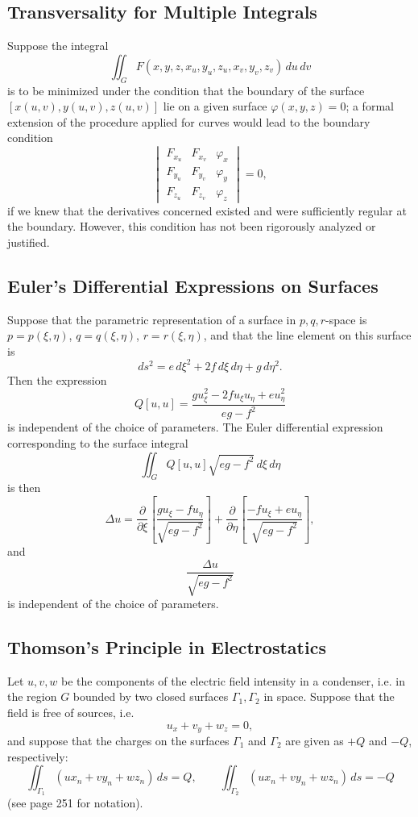 \subsection{Transversality for Multiple Integrals}
Suppose the integral
\[
\iint_G F(x,y,z,x_u,y_u,z_u,x_v,y_v,z_v)\,du\,dv
\]
is to be minimized under the condition that the boundary of the surface $[x(u,v),y(u,v),z(u,v)]$ lie on a given surface $\varphi(x,y,z)=0$; a formal extension of the procedure applied for curves would lead to the boundary condition
\[
\begin{vmatrix}
F_{x_u}&F_{x_v}&\varphi_x\\
F_{y_u}&F_{y_v}&\varphi_y\\
F_{z_u}&F_{z_v}&\varphi_z
\end{vmatrix}=0,
\]
if we knew that the derivatives concerned existed and were sufficiently regular at the boundary. However, this condition has not been rigorously analyzed or justified.

\subsection{Euler's Differential Expressions on Surfaces}
Suppose that the parametric representation of a surface in $p,q,r$-space is $p=p(\xi,\eta)$, $q=q(\xi,\eta)$, $r=r(\xi,\eta)$, and that the line element on this surface is
\[
ds^2=e\,d\xi^2+2f\,d\xi\,d\eta+g\,d\eta^2.
\]
Then the expression
\[
Q[u,u]=\frac{g u_\xi^2-2f u_\xi u_\eta+e u_\eta^2}{eg-f^2}
\]
is independent of the choice of parameters. The Euler differential expression corresponding to the surface integral
\[
\iint_G Q[u,u]\sqrt{eg-f^2}\,d\xi\,d\eta
\]
is then
\[
\Delta u=\frac{\partial}{\partial\xi}\left[\frac{g u_\xi-fu_\eta}{\sqrt{eg-f^2}}\right]
+\frac{\partial}{\partial\eta}\left[\frac{-f u_\xi+e u_\eta}{\sqrt{eg-f^2}}\right],
\]
and
\[
\frac{\Delta u}{\sqrt{eg-f^2}}
\]
is independent of the choice of parameters.

\subsection{Thomson's Principle in Electrostatics}
Let $u,v,w$ be the components of the electric field intensity in a condenser, i.e. in the region $G$ bounded by two closed surfaces $\Gamma_1,\Gamma_2$ in space. Suppose that the field is free of sources, i.e.
\begin{equation}\tag{110}
u_x+v_y+w_z=0,
\end{equation}
and suppose that the charges on the surfaces $\Gamma_1$ and $\Gamma_2$ are given as $+Q$ and $-Q$, respectively:
\begin{equation}\tag{111}
\iint_{\Gamma_1}(ux_n+vy_n+wz_n)\,ds=Q,
\qquad
\iint_{\Gamma_2}(ux_n+vy_n+wz_n)\,ds=-Q
\end{equation}
(see page 251 for notation).


